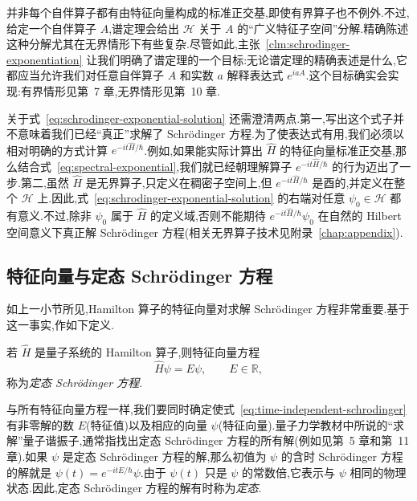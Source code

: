 并非每个自伴算子都有由特征向量构成的标准正交基,即使有界算子也不例外.不过,给定一个自伴算子 \(A\),谱定理会给出 \(\mathcal{H}\) 关于 \(A\) 的“广义特征子空间”分解.精确陈述这种分解尤其在无界情形下有些复杂.尽管如此,主张~\ref{clm:schrodinger-exponentiation} 让我们明确了谱定理的一个目标:无论谱定理的精确表述是什么,它都应当允许我们对任意自伴算子 \(A\) 和实数 \(a\) 解释表达式 \(e^{iaA}\).这个目标确实会实现:有界情形见第~7 章,无界情形见第~10 章.

关于式~\eqref{eq:schrodinger-exponential-solution} 还需澄清两点.第一,写出这个式子并不意味着我们已经“真正”求解了 Schrödinger 方程.为了使表达式有用,我们必须以相对明确的方式计算 \(e^{-it\widehat H/\hbar}\).例如,如果能实际计算出 \(\widehat H\) 的特征向量标准正交基,那么结合式~\eqref{eq:spectral-exponential},我们就已经朝理解算子 \(e^{-it\widehat H/\hbar}\) 的行为迈出了一步.第二,虽然 \(\widehat H\) 是无界算子,只定义在稠密子空间上,但 \(e^{-it\widehat H/\hbar}\) 是酉的,并定义在整个 \(\mathcal{H}\) 上.因此,式~\eqref{eq:schrodinger-exponential-solution} 的右端对任意 \(\psi_{0}\in\mathcal{H}\) 都有意义.不过,除非 \(\psi_{0}\) 属于 \(\widehat H\) 的定义域,否则不能期待 \(e^{-it\widehat H/\hbar}\psi_{0}\) 在自然的 Hilbert 空间意义下真正解 Schrödinger 方程(相关无界算子技术见附录~\ref{chap:appendix}).

\subsection{特征向量与定态 Schrödinger 方程}\label{subsec:time-independent-schrodinger}

如上一小节所见,Hamilton 算子的特征向量对求解 Schrödinger 方程非常重要.基于这一事实,作如下定义.

\begin{definition}[定态 Schrödinger 方程]\label{def:time-independent-schrodinger}
若 \(\widehat H\) 是量子系统的 Hamilton 算子,则特征向量方程
\begin{equation}
\widehat H\psi=E\psi,\qquad E\in\mathbb{R},
\label{eq:time-independent-schrodinger}
\end{equation}
称为\emph{定态 Schrödinger 方程}.
\end{definition}

与所有特征向量方程一样,我们要同时确定使式~\eqref{eq:time-independent-schrodinger} 有非零解的数 \(E\)(特征值)以及相应的向量 \(\psi\)(特征向量).量子力学教材中所说的“求解”量子谐振子,通常指找出定态 Schrödinger 方程的所有解(例如见第~5 章和第~11 章).如果 \(\psi\) 是定态 Schrödinger 方程的解,那么初值为 \(\psi\) 的含时 Schrödinger 方程的解就是 \(\psi(t)=e^{-itE/\hbar}\psi\).由于 \(\psi(t)\) 只是 \(\psi\) 的常数倍,它表示与 \(\psi\) 相同的物理状态.因此,定态 Schrödinger 方程的解有时称为\emph{定态}.

